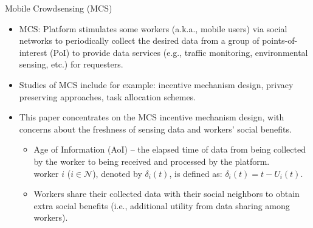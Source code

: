 \documentclass[aspectratio=169,xcolor=dvipsnames]{beamer}
\begin{document}
\begin{frame}[fragile]{Mobile Crowdsensing (MCS)}
    \footnotesize %
    \begin{itemize}
        \setlength{\itemsep}{0.5cm} %
        \item MCS: Platform stimulates some workers (a.k.a., mobile users) via social networks to periodically collect the desired data from a group of points-of-interest (PoI) to provide data services (e.g., traffic monitoring, environmental sensing, etc.) for requesters.\\ \pause
        
        \item Studies of MCS include for example: incentive mechanism design, privacy preserving approaches, task allocation schemes.\\ \pause
        
        \item This paper concentrates on the MCS incentive mechanism design, with concerns about the freshness of sensing data and workers’ social benefits.\\ \pause 
                
        \begin{itemize} %
            \setlength{\itemsep}{0.2cm} %
            \item Age of Information (AoI) – the elapsed time of data from being collected by the worker to being received and processed by the platform.\\
            worker \(i\) (\(i \in \mathcal{N}\)), denoted by \( \delta_i(t) \), is defined as: \(\delta_i(t) = t - U_i(t)\).\\ \pause
            
            \item Workers share their collected data with their social neighbors to obtain extra social benefits (i.e., additional utility from data sharing among workers).\\
        \end{itemize}
    \end{itemize}
\end{frame}
\end{document}
